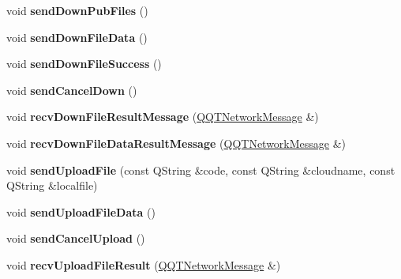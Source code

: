\begin{DoxyCompactItemize}
void {\bfseries send\+Down\+Pub\+Files} ()
\item 
\mbox{\label{class_q_q_t_cloud_protocol_a049a09f66dabc62ad7d42f32013cf8c4}} 
void {\bfseries send\+Down\+File\+Data} ()
\item 
\mbox{\label{class_q_q_t_cloud_protocol_a109ed5a53ad76d2da64f5c8b4e79b67e}} 
void {\bfseries send\+Down\+File\+Success} ()
\item 
\mbox{\label{class_q_q_t_cloud_protocol_a0d81465a0a7c4d0ee675efa12545c369}} 
void {\bfseries send\+Cancel\+Down} ()
\item 
\mbox{\label{class_q_q_t_cloud_protocol_a3b340d8c4479ec8131422c8722e91b1b}} 
void {\bfseries recv\+Down\+File\+Result\+Message} (\mbox{\hyperlink{class_q_q_t_network_message}{Q\+Q\+T\+Network\+Message}} \&)
\item 
\mbox{\label{class_q_q_t_cloud_protocol_ac14a5677c54d089c5aa2f2abefd871cc}} 
void {\bfseries recv\+Down\+File\+Data\+Result\+Message} (\mbox{\hyperlink{class_q_q_t_network_message}{Q\+Q\+T\+Network\+Message}} \&)
\item 
\mbox{\label{class_q_q_t_cloud_protocol_aee96028c15794ecd2862271df5f78b7d}} 
void {\bfseries send\+Upload\+File} (const Q\+String \&code, const Q\+String \&cloudname, const Q\+String \&localfile)
\item 
\mbox{\label{class_q_q_t_cloud_protocol_a01d778565a3fa0e14e1412bb422e8b47}} 
void {\bfseries send\+Upload\+File\+Data} ()
\item 
\mbox{\label{class_q_q_t_cloud_protocol_a548d52d1020c350e1d97719d2f2636cf}} 
void {\bfseries send\+Cancel\+Upload} ()
\item 
\mbox{\label{class_q_q_t_cloud_protocol_ad2a60187fce504edb0a640da0b94a460}} 
void {\bfseries recv\+Upload\+File\+Result} (\mbox{\hyperlink{class_q_q_t_network_message}{Q\+Q\+T\+Network\+Message}} \&)
\item 
\mbox{\label{class_q_q_t_cloud_protocol_a33c62b52ed2899198039b5496e2f69a6}} 

\end{DoxyCompactItemize}
